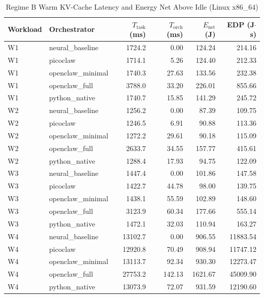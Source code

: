 \begin{table}[t]
\centering\small
\caption{Regime B Warm KV-Cache Latency and Energy Net Above Idle (Linux x86_64)}
\label{tab:linux_warm_cache}
\begin{tabular}{llrrrr}
\toprule
Workload & Orchestrator & $T_{\text{task}}$ (ms) & $T_{\text{orch}}$ (ms) & $E_{\text{net}}$ (J) & EDP (J$\cdot$s) \\
\midrule
W1 & neural\_baseline & 1724.2 & 0.00 & 124.24 & 214.16 \\
W1 & picoclaw & 1714.1 & 5.26 & 124.40 & 212.33 \\
W1 & openclaw\_minimal & 1740.3 & 27.63 & 133.56 & 232.38 \\
W1 & openclaw\_full & 3788.0 & 33.20 & 226.01 & 855.66 \\
W1 & python\_native & 1740.7 & 15.85 & 141.29 & 245.72 \\
W2 & neural\_baseline & 1256.2 & 0.00 & 87.39 & 109.75 \\
W2 & picoclaw & 1246.5 & 6.91 & 90.88 & 113.36 \\
W2 & openclaw\_minimal & 1272.2 & 29.61 & 90.18 & 115.09 \\
W2 & openclaw\_full & 2633.7 & 34.55 & 157.77 & 415.61 \\
W2 & python\_native & 1288.4 & 17.93 & 94.75 & 122.09 \\
W3 & neural\_baseline & 1447.4 & 0.00 & 101.86 & 147.58 \\
W3 & picoclaw & 1422.7 & 44.78 & 98.00 & 139.75 \\
W3 & openclaw\_minimal & 1438.1 & 55.59 & 102.89 & 148.60 \\
W3 & openclaw\_full & 3123.9 & 60.34 & 177.66 & 555.14 \\
W3 & python\_native & 1472.1 & 32.03 & 110.94 & 163.27 \\
W4 & neural\_baseline & 13102.7 & 0.00 & 906.55 & 11883.54 \\
W4 & picoclaw & 12920.8 & 70.49 & 908.94 & 11747.12 \\
W4 & openclaw\_minimal & 13113.7 & 92.34 & 930.30 & 12273.47 \\
W4 & openclaw\_full & 27753.2 & 142.13 & 1621.67 & 45009.90 \\
W4 & python\_native & 13073.9 & 72.07 & 931.59 & 12190.60 \\
\bottomrule
\end{tabular}
\end{table}
